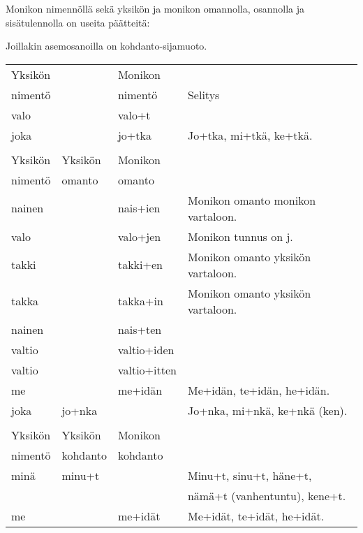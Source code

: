\begin{table}
Monikon nimennöllä sekä yksikön ja monikon omannolla, osannolla ja
sisätulennolla on useita päätteitä:

\bigskip
Joillakin asemosanoilla on kohdanto-sijamuoto.

\bigskip

\begin{tabular}{@{}|l|l|l|l|} \hline
Yksikön  &         & Monikon      & \\
nimentö  &         & nimentö      & Selitys \\ \hline
valo     &         & valo+t       & \\
joka     &         & jo+tka       & Jo+tka, mi+tkä, ke+tkä. \\ \hline

         &         &              & \\ \hline
Yksikön  & Yksikön & Monikon      & \\
nimentö  & omanto  & omanto       & \\ \hline
nainen   &         & nais+ien     & Monikon omanto monikon vartaloon. \\
valo     &         & valo+jen     & Monikon tunnus on j. \\
takki    &         & takki+en     & Monikon omanto yksikön vartaloon. \\
takka    &         & takka+in     & Monikon omanto yksikön vartaloon. \\
nainen   &         & nais+ten     & \\
valtio   &         & valtio+iden  & \\
valtio   &         & valtio+itten & \\
me       &         & me+idän      & Me+idän, te+idän, he+idän. \\
joka     & jo+nka  &              & Jo+nka, mi+nkä, ke+nkä (ken). \\ \hline

         &          &          & \\ \hline
Yksikön  & Yksikön  & Monikon  & \\
nimentö  & kohdanto & kohdanto & \\ \hline

minä     & minu+t   &          & Minu+t, sinu+t, häne+t, \\
         &          &          & nämä+t (vanhentuntu), kene+t. \\
me       &          & me+idät  & Me+idät, te+idät, he+idät. \\


\end{tabular}
\end{table}
